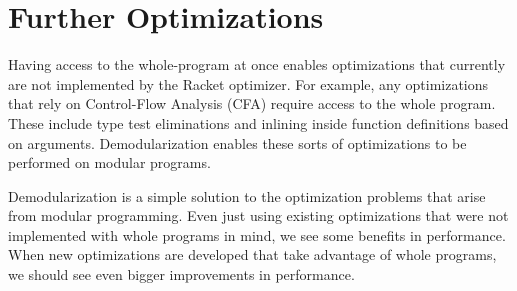 \section{Further Optimizations}

Having access to the whole-program at once enables optimizations that currently are not implemented by the Racket optimizer.
For example, any optimizations that rely on Control-Flow Analysis (CFA) \cite{cfa} require access to the whole program.
These include type test eliminations and inlining inside function definitions based on arguments.
Demodularization enables these sorts of optimizations to be performed on modular programs.

Demodularization is a simple solution to the optimization problems that arise from modular programming. 
Even just using existing optimizations that were not implemented with whole programs in mind, we see some benefits in performance. 
When new optimizations are developed that take advantage of whole programs, we should see even bigger improvements in performance.
